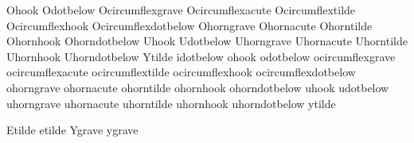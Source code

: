    Ohook                {}
   Odotbelow            {}
   Ocircumflexgrave     {}
   Ocircumflexacute     {}
   Ocircumflextilde     {}
   Ocircumflexhook      {}
   Ocircumflexdotbelow  {}
   Ohorngrave           {}
   Ohornacute           {}
   Ohorntilde           {}
   Ohornhook            {}
   Ohorndotbelow        {}
   Uhook                {}
   Udotbelow            {}
   Uhorngrave           {}
   Uhornacute           {}
   Uhorntilde           {}
   Uhornhook            {}
   Uhorndotbelow        {}
   Ytilde               {}
   idotbelow            {}
   ohook                {}
   odotbelow            {}
   ocircumflexgrave     {}
   ocircumflexacute     {}
   ocircumflextilde     {}
   ocircumflexhook      {}
   ocircumflexdotbelow  {}
   ohorngrave           {}
   ohornacute           {}
   ohorntilde           {}
   ohornhook            {}
   ohorndotbelow        {}
   uhook                {}
   udotbelow            {}
   uhorngrave           {}
   uhornacute           {}
   uhorntilde           {}
   uhornhook            {}
   uhorndotbelow        {}
   ytilde               {}

   Etilde               {}
   etilde               {}
   Ygrave               {}
   ygrave               {}

\stopencoding

\endinput
